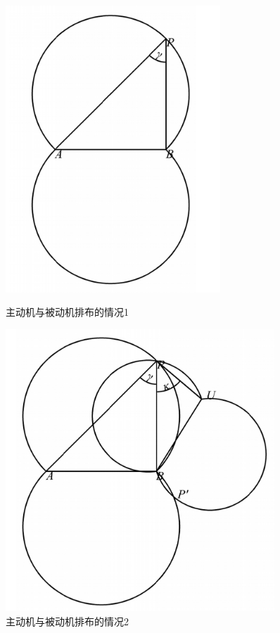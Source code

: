 \documentclass[withoutpreface,bwprint]{cumcmthesis} %
\begin{document}
\begin{figure}[H]
    \centering
    \begin{minipage}{0.49\textwidth}
        \centering
        \includegraphics[width=0.72\textwidth]{../figure/q2_1.png} 
        \caption{主动机与被动机排布的情况1}
        \label{q2_1}
    \end{minipage}
    \begin{minipage}{0.49\textwidth}
        \centering
        \includegraphics[width=0.9\textwidth]{../figure/q2_2.png} 
        \caption{主动机与被动机排布的情况2}
        \label{q2_2}   
    \end{minipage}
\end{figure}
\end{document}
